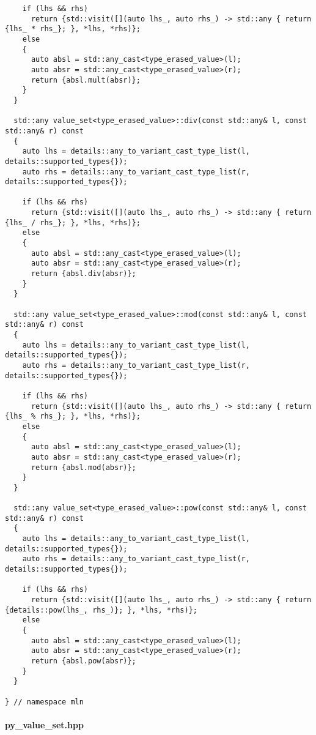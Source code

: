 \begin{verbatim}
    if (lhs && rhs)
      return {std::visit([](auto lhs_, auto rhs_) -> std::any { return {lhs_ * rhs_}; }, *lhs, *rhs)};
    else
    {
      auto absl = std::any_cast<type_erased_value>(l);
      auto absr = std::any_cast<type_erased_value>(r);
      return {absl.mult(absr)};
    }
  }

  std::any value_set<type_erased_value>::div(const std::any& l, const std::any& r) const
  {
    auto lhs = details::any_to_variant_cast_type_list(l, details::supported_types{});
    auto rhs = details::any_to_variant_cast_type_list(r, details::supported_types{});

    if (lhs && rhs)
      return {std::visit([](auto lhs_, auto rhs_) -> std::any { return {lhs_ / rhs_}; }, *lhs, *rhs)};
    else
    {
      auto absl = std::any_cast<type_erased_value>(l);
      auto absr = std::any_cast<type_erased_value>(r);
      return {absl.div(absr)};
    }
  }

  std::any value_set<type_erased_value>::mod(const std::any& l, const std::any& r) const
  {
    auto lhs = details::any_to_variant_cast_type_list(l, details::supported_types{});
    auto rhs = details::any_to_variant_cast_type_list(r, details::supported_types{});

    if (lhs && rhs)
      return {std::visit([](auto lhs_, auto rhs_) -> std::any { return {lhs_ % rhs_}; }, *lhs, *rhs)};
    else
    {
      auto absl = std::any_cast<type_erased_value>(l);
      auto absr = std::any_cast<type_erased_value>(r);
      return {absl.mod(absr)};
    }
  }

  std::any value_set<type_erased_value>::pow(const std::any& l, const std::any& r) const
  {
    auto lhs = details::any_to_variant_cast_type_list(l, details::supported_types{});
    auto rhs = details::any_to_variant_cast_type_list(r, details::supported_types{});

    if (lhs && rhs)
      return {std::visit([](auto lhs_, auto rhs_) -> std::any { return {details::pow(lhs_, rhs_)}; }, *lhs, *rhs)};
    else
    {
      auto absl = std::any_cast<type_erased_value>(l);
      auto absr = std::any_cast<type_erased_value>(r);
      return {absl.pow(absr)};
    }
  }

} // namespace mln
\end{verbatim}

\paragraph{py\_value\_set.hpp}
\label{appendix:static-dynamic-bridge.mm.vs.py_value_set.hpp}

